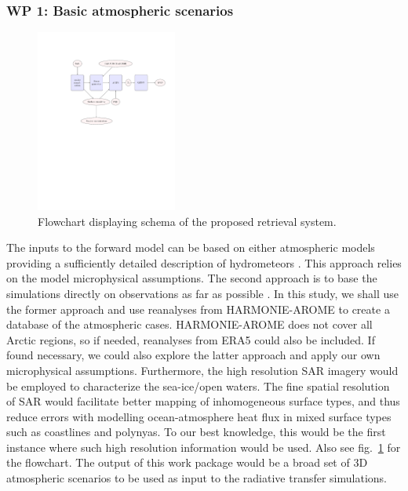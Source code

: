\documentclass[12pt,oneside,a4paper]{article}
\begin{document}
\subsubsection*{WP 1: Basic atmospheric scenarios}
%
\begin{figure}[t]
	\centering
	\includegraphics[trim=140 370 40 125,clip,height = 60mm]{flowchart.pdf} 
	\caption{Flowchart displaying schema of the proposed retrieval system.}
	\label{fig:flowchart}
\end{figure}
\label{sec:emissivity}
The inputs to the forward model can be based on either atmospheric models providing a sufficiently detailed description of hydrometeors \citep[e.g.][]{wang2017statistical}. This approach relies on the model microphysical assumptions. The second approach is to base the simulations directly on observations as far as possible \citep{ekelund:using:20}. In this study, we shall use the former approach and use reanalyses from HARMONIE-AROME to create a database of the atmospheric cases. HARMONIE-AROME does not cover all Arctic regions, so if needed, reanalyses from ERA5 could also be included. If found necessary, we could also explore the latter approach and apply our own microphysical assumptions. Furthermore, the high resolution SAR imagery would be employed to characterize the sea-ice/open waters. The fine spatial resolution of SAR would facilitate better mapping of inhomogeneous surface types, and thus reduce errors with modelling ocean-atmosphere heat flux in mixed surface types such as coastlines and polynyas. To our best knowledge, this would be the first instance where such high resolution information would be used. Also see fig.~\ref{fig:flowchart} for the flowchart. 
The output of this work package would be a broad set of 3D atmospheric scenarios to be used as input to the radiative transfer simulations.
\end{document}
